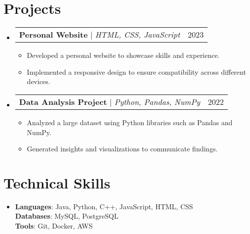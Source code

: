 \documentclass[letterpaper,11pt]{article}
\makeatletter
\newcommand{\resumeItem}[1]{
\item\small{
{#1 \vspace{-2pt}}
}
}
\newcommand{\resumeProjectHeading}[2]{
\item
\begin{tabular*}{0.97\textwidth}{l@{\extracolsep{\fill}}r}
\small#1 & #2 \\
\end{tabular*}\vspace{-7pt}
}
\newcommand{\resumeSubHeadingListStart}{\begin{itemize}[leftmargin=0.15in, label={}]}
\newcommand{\resumeSubHeadingListEnd}{\end{itemize}}
\newcommand{\resumeItemListStart}{\begin{itemize}}
\newcommand{\resumeItemListEnd}{\end{itemize}\vspace{-5pt}}
\makeatother
\begin{document}
\section{Projects}
\resumeSubHeadingListStart
\resumeProjectHeading{\textbf{Personal Website} $|$ \emph{HTML, CSS, JavaScript}}{2023}
\resumeItemListStart
\resumeItem{Developed a personal website to showcase skills and experience.}
\resumeItem{Implemented a responsive design to ensure compatibility across different devices.}
\resumeItemListEnd

\resumeProjectHeading{\textbf{Data Analysis Project} $|$ \emph{Python, Pandas, NumPy}}{2022}
\resumeItemListStart
\resumeItem{Analyzed a large dataset using Python libraries such as Pandas and NumPy.}
\resumeItem{Generated insights and visualizations to communicate findings.}
\resumeItemListEnd
\resumeSubHeadingListEnd

\section{Technical Skills} %
\begin{itemize}[leftmargin=0.15in, label={}]
\item{
\textbf{Languages}{: Java, Python, C++, JavaScript, HTML, CSS} \\
\textbf{Databases}{: MySQL, PostgreSQL} \\
\textbf{Tools}{: Git, Docker, AWS}
} \\
\end{itemize}


\end{document}
